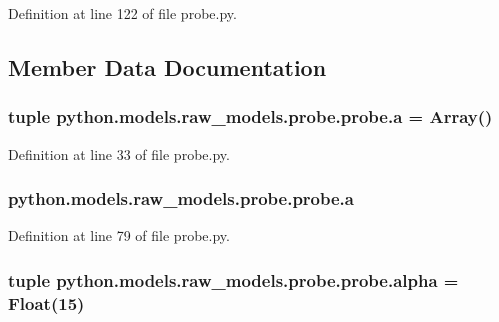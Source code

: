 Definition at line 122 of file probe.\-py.



\subsection{Member Data Documentation}
\hypertarget{classpython_1_1models_1_1raw__models_1_1probe_1_1probe_a5ae738610713a3594cb579713ba73035}{
\subsubsection[{a}]{\setlength{\rightskip}{0pt plus 5cm}tuple python.\-models.\-raw\-\_\-models.\-probe.\-probe.\-a = Array()\hspace{0.3cm}{\ttfamily [static]}}}\label{classpython_1_1models_1_1raw__models_1_1probe_1_1probe_a5ae738610713a3594cb579713ba73035}


Definition at line 33 of file probe.\-py.

\hypertarget{classpython_1_1models_1_1raw__models_1_1probe_1_1probe_a84f132a341ed16d32a294ff833c868be}{
\subsubsection[{a}]{\setlength{\rightskip}{0pt plus 5cm}python.\-models.\-raw\-\_\-models.\-probe.\-probe.\-a}}\label{classpython_1_1models_1_1raw__models_1_1probe_1_1probe_a84f132a341ed16d32a294ff833c868be}


Definition at line 79 of file probe.\-py.

\hypertarget{classpython_1_1models_1_1raw__models_1_1probe_1_1probe_a9bc42e657ff2b2b5e256d69d42257f4a}{
\subsubsection[{alpha}]{\setlength{\rightskip}{0pt plus 5cm}tuple python.\-models.\-raw\-\_\-models.\-probe.\-probe.\-alpha = Float(15)\hspace{0.3cm}{\ttfamily [static]}}}\label{classpython_1_1models_1_1raw__models_1_1probe_1_1probe_a9bc42e657ff2b2b5e256d69d42257f4a}


